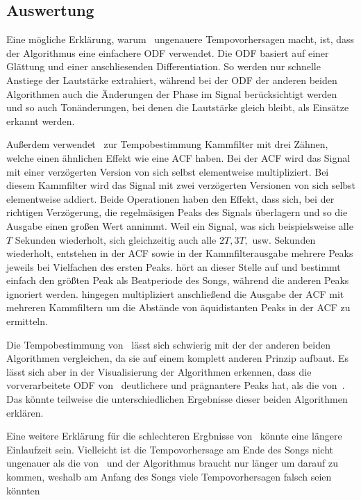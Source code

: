 {	\subsection{Auswertung}
	{

		Eine mögliche Erklärung,
			warum~\cite{2001_BeatThis} ungenauere Tempovorhersagen macht,
			ist,
			dass der Algorithmus eine einfachere \ac{ODF} verwendet.
		Die \ac{ODF} basiert auf einer Glättung und einer anschliesenden Differentiation.
		So werden nur schnelle Anstiege der Lautstärke extrahiert,
			während bei der \ac{ODF} der anderen beiden Algorithmen auch die Änderungen der Phase im Signal berücksichtigt werden
			und so auch Tonänderungen,
			bei denen die Lautstärke gleich bleibt,
			als Einsätze erkannt werden.

		Au{\ss}erdem verwendet~\cite{2001_BeatThis} zur Tempobestimmung Kammfilter mit drei Zähnen,
			welche einen ähnlichen Effekt wie eine \ac{ACF} haben.
		Bei der \ac{ACF} wird das Signal mit einer verzögerten Version von sich selbst elementweise multipliziert.
		Bei diesem Kammfilter wird das Signal mit zwei verzögerten Versionen von sich selbst elementweise addiert.
		Beide Operationen haben den Effekt,
			dass sich,
			bei der richtigen Verzögerung,
			die regelmäsigen Peaks des Signals überlagern
			und so die Ausgabe einen gro{\ss}en Wert annimmt.
		Weil ein Signal,
			was sich beispielsweise alle $T$ Sekunden wiederholt,
			sich gleichzeitig auch alle $2T, 3T,$ usw. Sekunden wiederholt,
			entstehen in der \ac{ACF} sowie in der Kammfilterausgabe mehrere Peaks jeweils bei Vielfachen des ersten Peaks.
		\cite{2001_BeatThis} hört an dieser Stelle auf
			und bestimmt einfach den grö{\ss}ten Peak als Beatperiode des Songs,
			während die anderen Peaks ignoriert werden.
		\cite{2009_DaPlSt} hingegen multipliziert anschlie{\ss}end die Ausgabe der \ac{ACF} mit mehreren Kammfiltern
			um die Abstände von äquidistanten Peaks in der \ac{ACF} zu ermitteln.

		Die Tempobestimmung von~\cite{2011_PlRoSt} lässt sich schwierig mit der der anderen beiden Algorithmen vergleichen,
			da sie auf einem komplett anderen Prinzip aufbaut.
		Es lässt sich aber in der Visualisierung der Algorithmen erkennen,
			dass die vorverarbeitete \ac{ODF} von~\cite{2009_DaPlSt} deutlichere und prägnantere Peaks hat,
			als die von~\cite{2011_PlRoSt}.
		Das könnte teilweise die unterschiedlichen Ergebnisse dieser beiden Algorithmen erklären.

		Eine weitere Erklärung für die schlechteren Ergbnisse von~\cite{2011_PlRoSt} könnte eine längere Einlaufzeit sein.
		Vielleicht ist die Tempovorhersage am Ende des Songs nicht ungenauer als die von~\cite{2009_DaPlSt}
			und der Algorithmus braucht nur länger um darauf zu kommen,
			weshalb am Anfang des Songs viele Tempovorhersagen falsch seien könnten
	}
}

